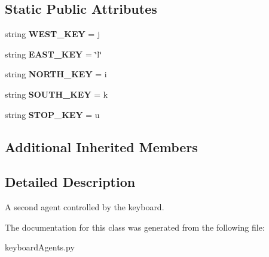 \subsection*{Static Public Attributes}
\begin{DoxyCompactItemize}
\item 
\mbox{\label{classkeyboard_agents_1_1_keyboard_agent2_aa3ef988d9fd4dd6332e6bafc5d7b0394}} 
string {\bfseries W\+E\+S\+T\+\_\+\+K\+EY} = \textquotesingle{}j\textquotesingle{}
\item 
\mbox{\label{classkeyboard_agents_1_1_keyboard_agent2_aaa3cb5f4c39f3a3f0db6f5f2b84edd56}} 
string {\bfseries E\+A\+S\+T\+\_\+\+K\+EY} = \char`\"{}l\char`\"{}
\item 
\mbox{\label{classkeyboard_agents_1_1_keyboard_agent2_a57c2562b51c56b8233076a44c4b6f014}} 
string {\bfseries N\+O\+R\+T\+H\+\_\+\+K\+EY} = \textquotesingle{}i\textquotesingle{}
\item 
\mbox{\label{classkeyboard_agents_1_1_keyboard_agent2_a50e5d60e42d3c1ac22c3f9e36dac32af}} 
string {\bfseries S\+O\+U\+T\+H\+\_\+\+K\+EY} = \textquotesingle{}k\textquotesingle{}
\item 
\mbox{\label{classkeyboard_agents_1_1_keyboard_agent2_a7ce3b23fb9b986174e839064dff885f5}} 
string {\bfseries S\+T\+O\+P\+\_\+\+K\+EY} = \textquotesingle{}u\textquotesingle{}
\end{DoxyCompactItemize}
\subsection*{Additional Inherited Members}


\subsection{Detailed Description}
\begin{DoxyVerb}A second agent controlled by the keyboard.
\end{DoxyVerb}
 

The documentation for this class was generated from the following file\+:\begin{DoxyCompactItemize}
\item 
keyboard\+Agents.\+py\end{DoxyCompactItemize}
